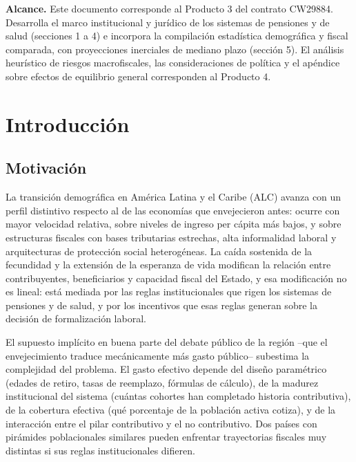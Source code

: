 \documentclass[12pt, letterpaper]{article}
\begin{document}
\vspace{0.5cm}

\begin{small}
\noindent\textbf{Alcance.} Este documento corresponde al Producto 3 del contrato
CW29884. Desarrolla el marco institucional y jurídico de los sistemas de pensiones
y de salud (secciones 1 a 4) e incorpora la compilación estadística demográfica y
fiscal comparada, con proyecciones inerciales de mediano plazo (sección 5). El
análisis heurístico de riesgos macrofiscales, las consideraciones de política y el
apéndice sobre efectos de equilibrio general corresponden al Producto 4.
\end{small}

\newpage

\tableofcontents
\newpage

\section{Introducción}

\subsection{Motivación}

La transición demográfica en América Latina y el Caribe (ALC) avanza con un perfil
distintivo respecto al de las economías que envejecieron antes: ocurre con mayor
velocidad relativa, sobre niveles de ingreso per cápita más bajos, y sobre estructuras
fiscales con bases tributarias estrechas, alta informalidad laboral y arquitecturas
de protección social heterogéneas. La caída sostenida de la fecundidad y la
extensión de la esperanza de vida modifican la relación entre contribuyentes,
beneficiarios y capacidad fiscal del Estado, y esa modificación no es lineal: está
mediada por las reglas institucionales que rigen los sistemas de pensiones y de
salud, y por los incentivos que esas reglas generan sobre la decisión de
formalización laboral.

El supuesto implícito en buena parte del debate público de la región --que el
envejecimiento traduce mecánicamente más gasto público-- subestima la complejidad
del problema. El gasto efectivo depende del diseño paramétrico (edades de retiro,
tasas de reemplazo, fórmulas de cálculo), de la madurez institucional del sistema
(cuántas cohortes han completado historia contributiva), de la cobertura efectiva
(qué porcentaje de la población activa cotiza), y de la interacción entre el pilar
contributivo y el no contributivo. Dos países con pirámides poblacionales similares
pueden enfrentar trayectorias fiscales muy distintas si sus reglas institucionales
difieren.
\end{document}
